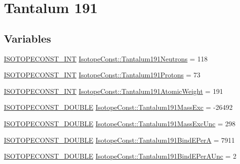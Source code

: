 \hypertarget{group___isotope_const-_tantalum-_ta191}{}\section{Tantalum 191}
\label{group___isotope_const-_tantalum-_ta191}
\subsection*{Variables}
\begin{DoxyCompactItemize}
\item 
\mbox{\hyperlink{group___isotope_const-_macros_ga5f18360b3e99483a35c32d789e62621c}{I\+S\+O\+T\+O\+P\+E\+C\+O\+N\+S\+T\+\_\+\+I\+NT}} \mbox{\hyperlink{group___isotope_const-_tantalum-_ta191_ga82e87fe40f112f99a9d0a0252831be78}{Isotope\+Const\+::\+Tantalum191\+Neutrons}} = 118
\item 
\mbox{\hyperlink{group___isotope_const-_macros_ga5f18360b3e99483a35c32d789e62621c}{I\+S\+O\+T\+O\+P\+E\+C\+O\+N\+S\+T\+\_\+\+I\+NT}} \mbox{\hyperlink{group___isotope_const-_tantalum-_ta191_ga5b207df2faa04c3f1cf7712a1df696a8}{Isotope\+Const\+::\+Tantalum191\+Protons}} = 73
\item 
\mbox{\hyperlink{group___isotope_const-_macros_ga5f18360b3e99483a35c32d789e62621c}{I\+S\+O\+T\+O\+P\+E\+C\+O\+N\+S\+T\+\_\+\+I\+NT}} \mbox{\hyperlink{group___isotope_const-_tantalum-_ta191_ga48136aa2c9bdf3320c35aec1bc4a6e9e}{Isotope\+Const\+::\+Tantalum191\+Atomic\+Weight}} = 191
\item 
\mbox{\hyperlink{group___isotope_const-_macros_ga8f45a7272ce02c0b4c65c44636ed719a}{I\+S\+O\+T\+O\+P\+E\+C\+O\+N\+S\+T\+\_\+\+D\+O\+U\+B\+LE}} \mbox{\hyperlink{group___isotope_const-_tantalum-_ta191_ga09196e9acaa56ca747667e6d9fa3a8e1}{Isotope\+Const\+::\+Tantalum191\+Mass\+Exc}} = -\/26492
\item 
\mbox{\hyperlink{group___isotope_const-_macros_ga8f45a7272ce02c0b4c65c44636ed719a}{I\+S\+O\+T\+O\+P\+E\+C\+O\+N\+S\+T\+\_\+\+D\+O\+U\+B\+LE}} \mbox{\hyperlink{group___isotope_const-_tantalum-_ta191_gaec35efc44b9e1b9efc54e086a07cd273}{Isotope\+Const\+::\+Tantalum191\+Mass\+Exc\+Unc}} = 298
\item 
\mbox{\hyperlink{group___isotope_const-_macros_ga8f45a7272ce02c0b4c65c44636ed719a}{I\+S\+O\+T\+O\+P\+E\+C\+O\+N\+S\+T\+\_\+\+D\+O\+U\+B\+LE}} \mbox{\hyperlink{group___isotope_const-_tantalum-_ta191_ga69b97354da0657bb3e366dd0c0201def}{Isotope\+Const\+::\+Tantalum191\+Bind\+E\+PerA}} = 7911
\item 
\mbox{\hyperlink{group___isotope_const-_macros_ga8f45a7272ce02c0b4c65c44636ed719a}{I\+S\+O\+T\+O\+P\+E\+C\+O\+N\+S\+T\+\_\+\+D\+O\+U\+B\+LE}} \mbox{\hyperlink{group___isotope_const-_tantalum-_ta191_ga5f27eadb5ff9bfdeab89182e6e9508c9}{Isotope\+Const\+::\+Tantalum191\+Bind\+E\+Per\+A\+Unc}} = 2

\end{DoxyCompactItemize}
